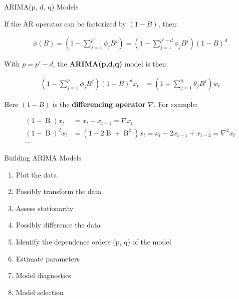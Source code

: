\documentclass[ignorenonframetext,xcolor=x11names]{beamer}
\begin{document}
\begin{frame}{ARIMA(p, d, q) Models}

If the AR operator can be factorized by $(1-B)$, then:

\begin{align*}
\phi (B) = \left(1 - \sum_{j=1}^{p'} \phi_j B^j \right) = \left(1 - \sum_{j=1}^{p'-d} \phi_j B^j \right) (1 - B)^d 
\end{align*}

With $p=p'-d$, the \textbf{ARIMA(p,d,q)} model is then:

\begin{align*}
\left( 1 - \sum_{j=1}^p \phi_j B^j \right) (1-B)^d x_t &= \left( 1 + \sum_{j=1}^q \theta_j B^j \right) w_t
\end{align*}

Here $(1-B)$ is the \textbf{differencing operator} $\nabla$. For example:

\begin{align*}
(1-\operatorname{B})x_t &= x_t - x_{t-1}  = \nabla x_t \\
(1-\operatorname{B})^2 x_t &= (1-2 \operatorname{B} + \operatorname{B}^2)x_t = x_t - 2x_{t-1} + x_{t-2} = \nabla^2 x_t\\
\cdots
\end{align*}

\end{frame}



\begin{frame}{Building ARIMA Models}
\begin{enumerate}
  \item Plot the data
  \item Possibly transform the data
  \item Assess stationarity
  \item Possibly difference the data
  \item Identify the dependence orders (p, q) of the model
  \item Estimate parameters
  \item Model diagnostics
  \item Model selection
\end{enumerate}
\end{frame}
\end{document}
